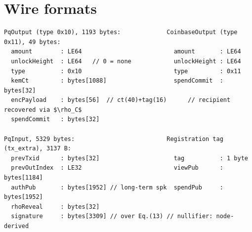\documentclass[11pt,a4paper]{article}
\begin{document}
\section{Wire formats}\label{app:wire}

\begin{lstlisting}[style=pseudo]
PqOutput (type 0x10), 1193 bytes:             CoinbaseOutput (type 0x11), 49 bytes:
  amount        : LE64                          amount       : LE64
  unlockHeight  : LE64   // 0 = none            unlockHeight : LE64
  type          : 0x10                          type         : 0x11
  kemCt         : bytes[1088]                   spendCommit  : bytes[32]
  encPayload    : bytes[56]  // ct(40)+tag(16)      // recipient recovered via $\rho_C$
  spendCommit   : bytes[32]

PqInput, 5329 bytes:                          Registration tag (tx_extra), 3137 B:
  prevTxid      : bytes[32]                     tag          : 1 byte
  prevOutIndex  : LE32                          viewPub      : bytes[1184]
  authPub       : bytes[1952] // long-term spk  spendPub     : bytes[1952]
  rhoReveal     : bytes[32]
  signature     : bytes[3309] // over Eq.(13) // nullifier: node-derived
\end{lstlisting}
\end{document}

